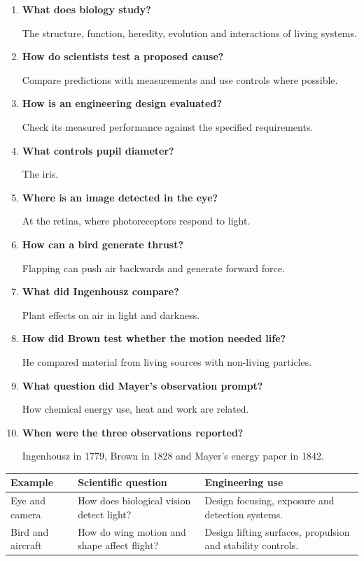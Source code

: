 \documentclass[12pt,a4paper]{article}
\newcommand{\Q}[1]{\textbf{#1}\par\noindent\ignorespaces}
\begin{document}
\begin{tcolorbox}[exambox, title={Frequently Asked / Viva Questions}]
\begin{enumerate}[topsep=0pt, label=\textbf{Q\arabic*.}, itemsep=5pt, leftmargin=*]
  \item \Q{What does biology study?}
    The structure, function, heredity, evolution and interactions of living systems.
  \item \Q{How do scientists test a proposed cause?}
    Compare predictions with measurements and use controls where possible.
  \item \Q{How is an engineering design evaluated?}
    Check its measured performance against the specified requirements.
  \item \Q{What controls pupil diameter?}
    The iris.
  \item \Q{Where is an image detected in the eye?}
    At the retina, where photoreceptors respond to light.
  \item \Q{How can a bird generate thrust?}
    Flapping can push air backwards and generate forward force.
  \item \Q{What did Ingenhousz compare?}
    Plant effects on air in light and darkness.
  \item \Q{How did Brown test whether the motion needed life?}
    He compared material from living sources with non-living particles.
  \item \Q{What question did Mayer's observation prompt?}
    How chemical energy use, heat and work are related.
  \item \Q{When were the three observations reported?}
    Ingenhousz in 1779, Brown in 1828 and Mayer's energy paper in 1842.
\end{enumerate}
\end{tcolorbox}

\begin{tcolorbox}[tikzbox, title={Summary Comparison}]
\par\vspace{5pt}
\begingroup
\setlength{\extrarowheight}{1pt}
\noindent\begin{tabularx}{\linewidth}{|B{3.45cm}|Y|Y|}
\hline
\textbf{Example} & \textbf{Scientific question} & \textbf{Engineering use} \\ \hline
Eye and camera & How does biological vision detect light? & Design focusing, exposure and detection systems. \\ \hline
Bird and aircraft & How do wing motion and shape affect flight? & Design lifting surfaces, propulsion and stability controls. \\ \hline
\end{tabularx}\par
\endgroup
\end{tcolorbox}
\end{document}
